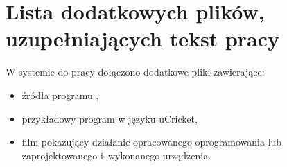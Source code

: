 \chapter{Lista dodatkowych plików, uzupełniających tekst pracy} 


W systemie do pracy dołączono dodatkowe pliki zawierające:
\begin{itemize}
\item źródła programu ,
\item przykładowy program w języku uCricket,
\item film pokazujący działanie opracowanego oprogramowania lub zaprojektowanego i~wykonanego urządzenia.
\end{itemize}
